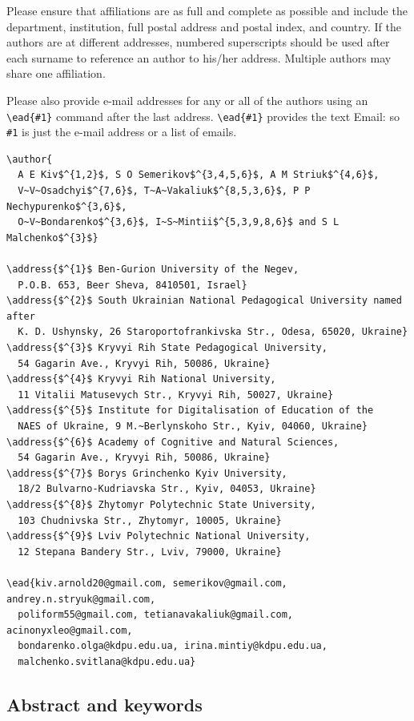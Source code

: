 \documentclass[a4paper]{jpconf}
\begin{document}
Please ensure that affiliations are as full and complete as possible and include the department, institution, full postal address and postal index, and country. 
If the authors are at different addresses, numbered superscripts should be used after each surname to reference an author to his/her address.
Multiple authors may share one affiliation. 

Please also provide e-mail addresses for any or all of the authors using an \verb"\ead{#1}" command after the last address. \verb"\ead{#1}" provides the text Email: so \verb"#1" is just the e-mail address or a list of emails.  

\begin{verbatim}
\author{
  A E Kiv$^{1,2}$, S O Semerikov$^{3,4,5,6}$, A M Striuk$^{4,6}$, 
  V~V~Osadchyi$^{7,6}$, T~A~Vakaliuk$^{8,5,3,6}$, P P Nechypurenko$^{3,6}$, 
  O~V~Bondarenko$^{3,6}$, I~S~Mintii$^{5,3,9,8,6}$ and S L Malchenko$^{3}$}

\address{$^{1}$ Ben-Gurion University of the Negev, 
  P.O.B. 653, Beer Sheva, 8410501, Israel}
\address{$^{2}$ South Ukrainian National Pedagogical University named after 
  K. D. Ushynsky, 26 Staroportofrankivska Str., Odesa, 65020, Ukraine}
\address{$^{3}$ Kryvyi Rih State Pedagogical University, 
  54 Gagarin Ave., Kryvyi Rih, 50086, Ukraine}
\address{$^{4}$ Kryvyi Rih National University, 
  11 Vitalii Matusevych Str., Kryvyi Rih, 50027, Ukraine}
\address{$^{5}$ Institute for Digitalisation of Education of the 
  NAES of Ukraine, 9 M.~Berlynskoho Str., Kyiv, 04060, Ukraine}
\address{$^{6}$ Academy of Cognitive and Natural Sciences, 
  54 Gagarin Ave., Kryvyi Rih, 50086, Ukraine}
\address{$^{7}$ Borys Grinchenko Kyiv University, 
  18/2 Bulvarno-Kudriavska Str., Kyiv, 04053, Ukraine}
\address{$^{8}$ Zhytomyr Polytechnic State University, 
  103 Chudnivska Str., Zhytomyr, 10005, Ukraine}
\address{$^{9}$ Lviv Polytechnic National University, 
  12 Stepana Bandery Str., Lviv, 79000, Ukraine}

\ead{kiv.arnold20@gmail.com, semerikov@gmail.com, andrey.n.stryuk@gmail.com, 
  poliform55@gmail.com, tetianavakaliuk@gmail.com, acinonyxleo@gmail.com, 
  bondarenko.olga@kdpu.edu.ua, irina.mintiy@kdpu.edu.ua, 
  malchenko.svitlana@kdpu.edu.ua}

\end{verbatim}

\subsection{Abstract and keywords}
\end{document}
